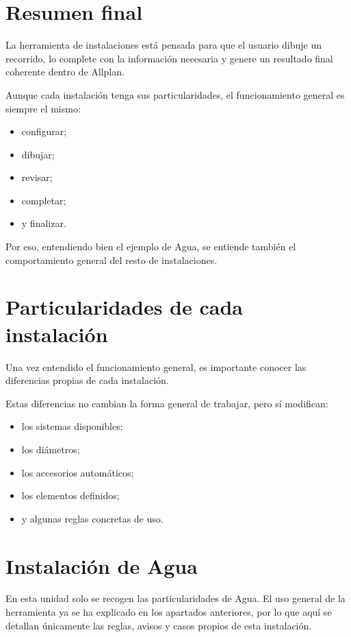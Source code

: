 \documentclass[12pt,a4paper]{article}
\begin{document}
\section{Resumen final}

La herramienta de instalaciones está pensada para que el usuario dibuje un recorrido, lo complete con la información necesaria y genere un resultado final coherente dentro de Allplan.

Aunque cada instalación tenga sus particularidades, el funcionamiento general es siempre el mismo:

\begin{itemize}
\item configurar;
\item dibujar;
\item revisar;
\item completar;
\item y finalizar.
\end{itemize}

Por eso, entendiendo bien el ejemplo de Agua, se entiende también el comportamiento general del resto de instalaciones.

\section{Particularidades de cada instalación}

Una vez entendido el funcionamiento general, es importante conocer las diferencias propias de cada instalación.

Estas diferencias no cambian la forma general de trabajar, pero sí modifican:

\begin{itemize}
\item los sistemas disponibles;
\item los diámetros;
\item los accesorios automáticos;
\item los elementos definidos;
\item y algunas reglas concretas de uso.
\end{itemize}

\section{Instalación de Agua}

\noindent En esta unidad solo se recogen las particularidades de Agua. El uso general de la herramienta ya se ha explicado en los apartados anteriores, por lo que aquí se detallan únicamente las reglas, avisos y casos propios de esta instalación.
\end{document}
